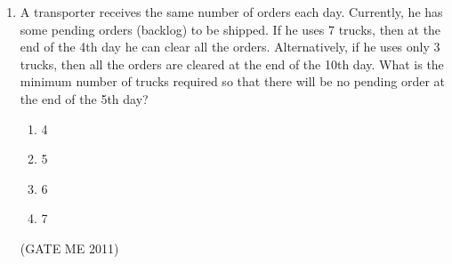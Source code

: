 \documentclass[journal]{IEEEtran}
\begin{document}
\begin{enumerate}
\item A transporter receives the same number of orders each day. Currently, he has some pending orders (backlog) to be shipped. If he uses 7 trucks, then at the end of the 4th day he can clear all the orders. Alternatively, if he uses only 3 trucks, then all the orders are cleared at the end of the 10th day. What is the minimum number of trucks required so that there will be no pending order at the end of the 5th day?
\begin{multicols}{4}
  \begin{enumerate}
    \item 4  
    \item 5  
    \item 6  
    \item 7  
  \end{enumerate}
\end{multicols}     
\hfill (GATE ME 2011)

\end{enumerate}
\end{document}
